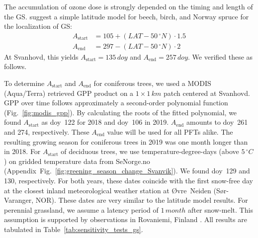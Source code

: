 \documentclass[bg, manuscript]{copernicus}
\begin{document}
The accumulation of ozone dose is strongly depended on the timing and length of the GS. \citet{ICP:MappingManual2017} suggest a simple latitude model for beech, birch, and Norway spruce for the localization of GS:
%
\begin{align}
  A_\mathrm{start} &= 105 + (LAT-50\,\unit{^\circ N})\cdot 1.5\\
  A_\mathrm{end} &= 297 - (LAT-50\,\unit{^\circ N})\cdot 2
\end{align}
%
At Svanhovd, this yields $A_\mathrm{start}=135\,\unit{doy}$ and $A_\mathrm{end}=257\,\unit{doy}$. We verified these as follows.

To determine $A_\text{start}$ and $A_\text{end}$ for coniferous trees, we used a MODIS (Aqua/Terra) retrieved GPP product \citep{MODIS_PSN} on a $1\times 1\,\unit{km}$ patch centered at Svanhovd. GPP over time follows approximately a second-order polynomial function (Fig.~\ref{fig:modis_gpp}). By calculating the roots of the fitted polynomial, we found $A_\text{start}$ as \unit{doy}~122 for 2018 and \unit{doy}~106 in 2019. $A_\text{end}$ amounts to \unit{doy}~261 and 274, respectively. These $A_\mathrm{end}$ value will be used for all PFTs alike. The resulting growing season for coniferous trees in 2019 was one month longer than in 2018. For $A_\text{start}$ of deciduous trees, we use temperature-degree-days (above $5\,\unit{^\circ C}$) on gridded temperature data from SeNorge.no (Appendix~Fig.~\ref{fig:greening_season_change_Svanvik}). We found \unit{doy}~129 and 130, respectively. For both years, these dates coincide with the first snow-free day at the closest inland meteorological weather station at Øvre~Neiden (Sør-Varanger, NOR). These dates are very similar to the latitude model results. For perennial grassland, we assume a latency period of $1\,\unit{month}$ after snow-melt. This assumption is supported by observations in Rovaniemi, Finland \citep[][Supplement~Fig.~S1]{FCR:Korhonen2018}. All results are tabulated in Table~\ref{tab:sensitivity_tests_gs}.
\end{document}

